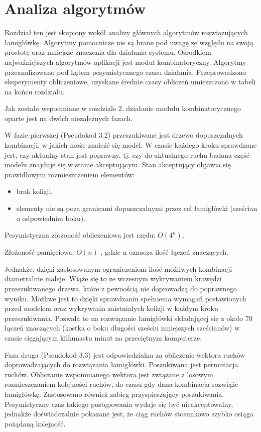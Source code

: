 \chapter{Analiza algorytmów}
\thispagestyle{chapterBeginStyle}

Rozdział ten jest skupiony wokół analizy głównych algorytmów rozwiązujących łamigłówkę. Algorytmy pomocnicze nie są brane pod uwagę ze względu na swoją prostotę oraz mniejsze znaczenia dla działania systemu. Ośrodkiem najważniejszych algorytmów aplikacji jest moduł kombinatoryczny. Algorytmy przeanalizowano pod kątem pesymistycznego czasu działania\cite{Algorithms}. Przeprowadzono eksperymenty obliczeniowe, uzyskane średnie czasy obliczeń umieszczono w tabeli na końcu rozdziału.

Jak zostało wspomniane w rozdziale 2. działanie modułu kombinatorycznego oparte jest na dwóch niezależnych fazach.

W fazie pierwszej (Pseudokod 3.2) przeszukiwane jest drzewo dopuszczalnych kombinacji, w jakich może znaleźć się model. W czasie każdego kroku sprawdzane jest, czy aktualny stan jest poprawny, tj. czy do aktualnego ruchu badana część modelu znajduje się w stanie akceptującym. Stan akceptujący objawia się prawidłowym rozmieszczeniem elementów:
\begin{itemize}
\item brak kolizji,
\item elementy nie są poza granicami dopuszczalnymi przez cel łamigłówki (sześcian o odpowiednim boku).
\end{itemize}

Pesymistyczna złożoność obliczeniowa jest rzędu: $ O(4^{n}) $,

Złożoność pamięciowa: $ O(n) $ , gdzie n oznacza ilość łączeń znaczących.

Jednakże, dzięki zastosowanym ograniczeniom ilość możliwych kombinacji diametralnie maleje. Wiąże się to ze wczesnym wykrywaniem krawędzi przeszukiwanego drzewa, które z pewnością nie doprowadzą do poprawnego wyniku. Możliwe jest to dzięki sprawdzaniu spełnienia wymagań postawionych przed modelem oraz wykrywania zaistniałych kolizji w każdym kroku przeszukiwania. Pozwala to na rozwiązanie łamigłówki składającej się z około 70 łączeń znaczących (kostka o boku długości sześciu mniejszych sześcianów) w czasie sięgającym kilkunastu minut na przeciętnym komputerze. 

Faza druga (Pseudokod 3.3) jest odpowiedzialna za obliczenie wektora ruchów doprowadzających do rozwiązania łamigłówki. Poszukiwana jest permutacja ruchów. Obliczanie wspomnianego wektora jest związane z losowym rozmieszczaniem kolejności ruchów, do czasu gdy dana kombinacja rozwiąże łamigłówkę. Zastosowano również zabieg przyspieszający poszukiwania. Pesymistyczny czas takiego postępowania wydaje się być nieakceptowalny, jednakże doświadczalnie pokazane jest, że ciąg ruchów stosunkowo szybko osiąga pożądaną kolejność.

